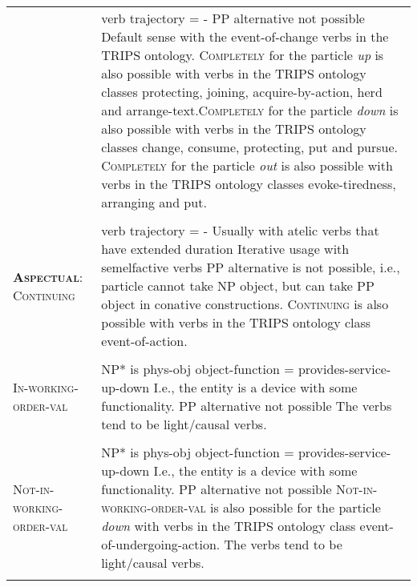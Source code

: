 \documentclass[output=paper
,modfonts
,nonflat]{langsci/langscibook}
\begin{document}
\begin{table}
{\begin{tabular}{p{2.5in}p{8.9in}}
    & verb trajectory = - \newline PP alternative not possible \newline Default sense with the event-of-change verbs in the TRIPS ontology. \newline \textsc{Completely} for the particle \textit{up} is also possible with verbs in the TRIPS ontology classes protecting, joining, acquire-by-action, herd and arrange-text.\newline \textsc{Completely} for the particle \textit{down} is also possible with verbs in the TRIPS ontology classes change, consume, protecting, put and pursue. \newline \textsc{Completely} for the particle \textit{out} is also possible with verbs in the TRIPS ontology classes evoke-tiredness, arranging and put.\\\\
  \textbf{\textsc{Aspectual}}: \newline \textsc{Continuing}
   & verb trajectory = - \newline Usually with atelic verbs that have extended duration \newline Iterative usage with semelfactive verbs \newline PP alternative is not possible, i.e., particle cannot take NP object, but can take PP object in conative constructions. \newline \textsc{Continuing} is also possible with verbs in the TRIPS ontology class event-of-action.\\\\ 
  \textsc{In-working-order-val}
    & NP* is phys-obj \newline object-function = provides-service-up-down \newline I.e., the entity is a device with some functionality. \newline PP alternative not possible \newline The verbs tend to be light/causal verbs. \\\\
  \textsc{Not-in-working-order-val}
    & NP* is phys-obj \newline object-function = provides-service-up-down \newline I.e., the entity is a device with some functionality. \newline PP alternative not possible \newline \textsc{Not-in-working-order-val} is also possible for the particle \textit{down} with verbs in the TRIPS ontology class event-of-undergoing-action. \newline The verbs tend to be light/causal verbs. \\\\ 

\end{tabular}}
\end{table}
\end{document}
